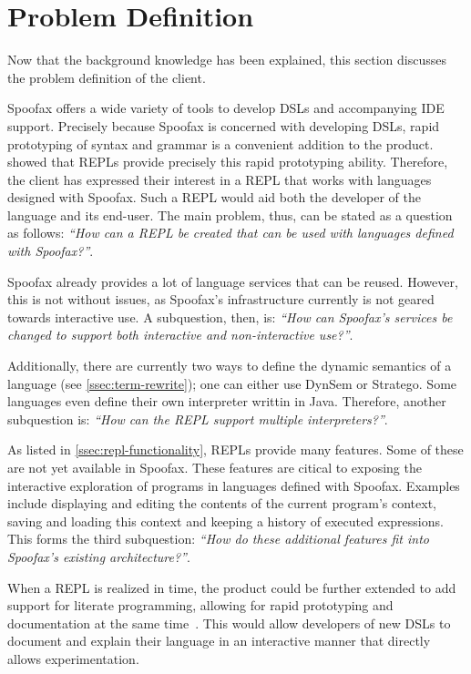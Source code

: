 \section{Problem Definition}
\label{sec:problem-definition}

Now that the background knowledge has been explained, this section discusses the
problem definition of the client.

Spoofax offers a wide variety of tools to develop DSLs and accompanying IDE
support. Precisely because Spoofax is concerned with developing DSLs, rapid
prototyping of syntax and grammar is a convenient addition to the product.
 showed that REPLs provide precisely this rapid prototyping
ability.  Therefore, the client has expressed their interest in a REPL that
works with languages designed with Spoofax. Such a REPL would aid both the
developer of the language and its end-user. The main problem, thus, can be
stated as a question as follows: \textit{``How can a REPL be created that can be
used with languages defined with Spoofax?''}.

Spoofax already provides a lot of language services that can be reused. However,
this is not without issues, as Spoofax's infrastructure currently is not geared
towards interactive use. A subquestion, then, is: \textit{``How can Spoofax's
services be changed to support both interactive and non-interactive use?''}.

Additionally, there are currently two ways to define the dynamic semantics of a
language (see \cref{ssec:term-rewrite}); one can either use DynSem or Stratego.
Some languages even define their own interpreter writtin in Java. Therefore,
another subquestion is: \textit{``How can the REPL support multiple
interpreters?''}.

As listed in \cref{ssec:repl-functionality}, REPLs provide many features. Some
of these are not yet available in Spoofax. These features are citical to
exposing the interactive exploration of programs in languages defined with
Spoofax. Examples include displaying and editing the contents of the current
program's context, saving and loading this context and keeping a history of
executed expressions. This forms the third subquestion: \textit{``How do these
additional features fit into Spoofax's existing architecture?''}.

When a REPL is realized in time, the product could be further extended to add
support for literate programming, allowing for rapid prototyping and
documentation at the same time~\cite{schulte2012}. This would allow
developers of new DSLs to document and explain their language in an
interactive manner that directly allows experimentation.

